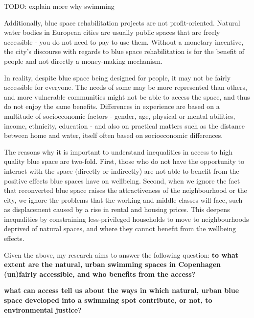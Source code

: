 \documentclass{article}
\begin{document}
TODO: explain more why swimming

Additionally, blue space rehabilitation projects are not profit-oriented. Natural water bodies in European cities are usually public spaces that are freely accessible - you do not need to pay to use them. Without a monetary incentive, the city's discourse with regards to blue space rehabilitation is for the benefit of people and not directly a money-making mechanism.


In reality, despite blue space being designed for people, it may not be fairly accessible for everyone. The needs of some may be more represented than others, and more vulnerable communities might not be able to access the space, and thus do not enjoy the same benefits. Differences in experience are based on a multitude of socioeconomic factors - gender, age, physical or mental abilities, income, ethnicity, education - and also on practical matters such as the distance between home and water, itself often based on socioeconomic differences.

The reasons why it is important to understand inequalities in access to high quality blue space are two-fold. 
First, those who do not have the opportunity to interact with the space (directly or indirectly) are not able to benefit from the positive effects blue spaces have on wellbeing. %
Second, when we ignore the fact that reconverted blue space raises the attractiveness of the neighbourhood or the city, we ignore the problems that the working and middle classes will face, such as displacement caused by a rise in rental and housing prices. This deepens inequalities by constraining less-privileged households to move to neighbourhoods deprived of natural spaces, and where they cannot benefit from the wellbeing effects.

Given the above, my research aims to answer the following question: \textbf{to what extent are the natural, urban swimming spaces in Copenhagen (un)fairly accessible, and who benefits from the access?}

\textbf{what can access tell us about the ways in which natural, urban blue space developed into a swimming spot contribute, or not, to environmental justice?}
\end{document}
